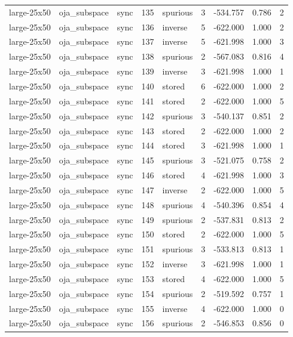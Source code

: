 \begin{tabular}{lllrlrrrr}
large-25x50 & oja\_subspace & sync & 135 & spurious & 3 & -534.757 & 0.786 & 2 \\
large-25x50 & oja\_subspace & sync & 136 & inverse & 5 & -622.000 & 1.000 & 2 \\
large-25x50 & oja\_subspace & sync & 137 & inverse & 5 & -621.998 & 1.000 & 3 \\
large-25x50 & oja\_subspace & sync & 138 & spurious & 2 & -567.083 & 0.816 & 4 \\
large-25x50 & oja\_subspace & sync & 139 & inverse & 3 & -621.998 & 1.000 & 1 \\
large-25x50 & oja\_subspace & sync & 140 & stored & 6 & -622.000 & 1.000 & 2 \\
large-25x50 & oja\_subspace & sync & 141 & stored & 2 & -622.000 & 1.000 & 5 \\
large-25x50 & oja\_subspace & sync & 142 & spurious & 3 & -540.137 & 0.851 & 2 \\
large-25x50 & oja\_subspace & sync & 143 & stored & 2 & -622.000 & 1.000 & 2 \\
large-25x50 & oja\_subspace & sync & 144 & stored & 3 & -621.998 & 1.000 & 1 \\
large-25x50 & oja\_subspace & sync & 145 & spurious & 3 & -521.075 & 0.758 & 2 \\
large-25x50 & oja\_subspace & sync & 146 & stored & 4 & -621.998 & 1.000 & 3 \\
large-25x50 & oja\_subspace & sync & 147 & inverse & 2 & -622.000 & 1.000 & 5 \\
large-25x50 & oja\_subspace & sync & 148 & spurious & 4 & -540.396 & 0.854 & 4 \\
large-25x50 & oja\_subspace & sync & 149 & spurious & 2 & -537.831 & 0.813 & 2 \\
large-25x50 & oja\_subspace & sync & 150 & stored & 2 & -622.000 & 1.000 & 5 \\
large-25x50 & oja\_subspace & sync & 151 & spurious & 3 & -533.813 & 0.813 & 1 \\
large-25x50 & oja\_subspace & sync & 152 & inverse & 3 & -621.998 & 1.000 & 1 \\
large-25x50 & oja\_subspace & sync & 153 & stored & 4 & -622.000 & 1.000 & 5 \\
large-25x50 & oja\_subspace & sync & 154 & spurious & 2 & -519.592 & 0.757 & 1 \\
large-25x50 & oja\_subspace & sync & 155 & inverse & 4 & -622.000 & 1.000 & 0 \\
large-25x50 & oja\_subspace & sync & 156 & spurious & 2 & -546.853 & 0.856 & 0 \\

\end{tabular}
